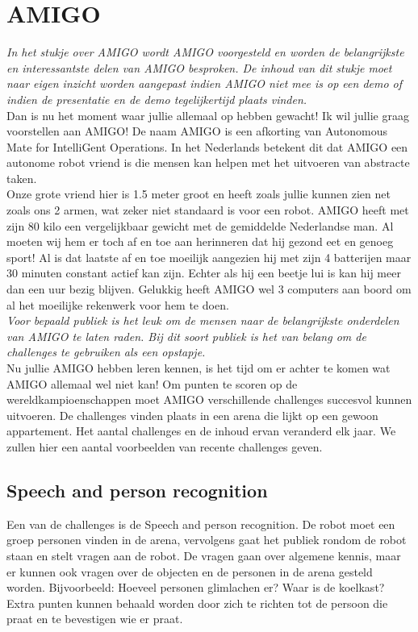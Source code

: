 \documentclass[a4paper,10pt]{article}
\numberwithin{equation}{section}
\numberwithin{figure}{section}
\numberwithin{table}{section}
\begin{document}
\section*{AMIGO}
\textit{In het stukje over AMIGO wordt AMIGO voorgesteld en worden de belangrijkste en interessantste delen van AMIGO besproken. De inhoud van dit stukje moet naar eigen inzicht worden aangepast indien AMIGO niet mee is op een demo of indien de presentatie en de demo tegelijkertijd plaats vinden.}\\


Dan is nu het moment waar jullie allemaal op hebben gewacht! Ik wil jullie graag voorstellen aan AMIGO! De naam AMIGO is een afkorting van Autonomous Mate for IntelliGent Operations. In het Nederlands betekent dit dat AMIGO een autonome robot vriend is die mensen kan helpen met het uitvoeren van abstracte taken. \\

Onze grote vriend hier is 1.5 meter groot en heeft zoals jullie kunnen zien net zoals ons 2 armen, wat zeker niet standaard is voor een robot. AMIGO heeft met zijn 80 kilo een vergelijkbaar gewicht met de gemiddelde Nederlandse man. Al moeten wij hem er toch af en toe aan herinneren dat hij gezond eet en genoeg sport!
Al is dat laatste af en toe moeilijk aangezien hij met zijn 4 batterijen maar 30 minuten constant actief kan zijn. Echter als hij een beetje lui is kan hij meer dan een uur bezig blijven. Gelukkig heeft AMIGO wel 3 computers aan boord om al het moeilijke rekenwerk voor hem te doen.\\

\textit{Voor bepaald publiek is het leuk om de mensen naar de belangrijkste onderdelen van AMIGO te laten raden. Bij dit soort publiek is het van belang om de challenges te gebruiken als een opstapje.}\\

Nu jullie AMIGO hebben leren kennen, is het tijd om er achter te komen wat AMIGO allemaal wel niet kan! Om punten te scoren op de wereldkampioenschappen moet AMIGO verschillende challenges succesvol kunnen uitvoeren. De challenges vinden plaats in een arena die lijkt op een gewoon appartement. Het aantal challenges en de inhoud ervan veranderd elk jaar. We zullen hier een aantal voorbeelden van recente challenges geven.

\subsection*{Speech and person recognition}
Een van de challenges is de Speech and person recognition. De robot moet een groep personen vinden in de arena, vervolgens gaat het publiek rondom de robot staan en stelt vragen aan de robot. De vragen gaan over algemene kennis, maar er kunnen ook vragen over de objecten en de personen in de arena gesteld worden. Bijvoorbeeld: Hoeveel personen glimlachen er? Waar is de koelkast? Extra punten kunnen behaald worden door zich te richten tot de persoon die praat en te bevestigen wie er praat. 
\end{document}
